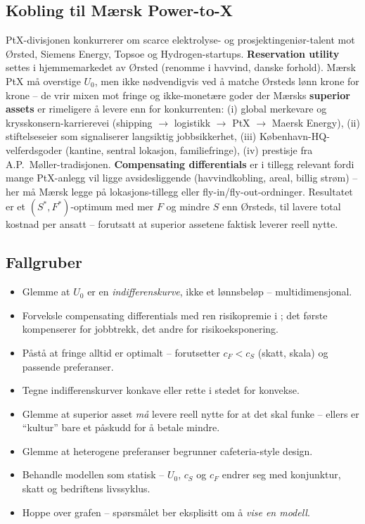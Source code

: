 \subsection*{Kobling til Mærsk Power-to-X}\quad [CASE]
PtX-divisjonen konkurrerer om scarce elektrolyse- og prosjektingeniør-talent mot Ørsted, Siemens Energy, Topsoe og Hydrogen-startups. \textbf{Reservation utility} settes i hjemmemarkedet av Ørsted (renomme i havvind, danske forhold). Mærsk PtX må overstige $U_0$, men ikke nødvendigvis ved å matche Ørsteds lønn krone for krone -- de vrir mixen mot fringe og ikke-monetære goder der Mærsks \textbf{superior assets} er rimeligere å levere enn for konkurrenten: (i) global merkevare og krysskonsern-karrierevei (shipping $\to$ logistikk $\to$ PtX $\to$ Maersk Energy), (ii) stiftelseseier som signaliserer langsiktig jobbsikkerhet, (iii) København-HQ-velferdsgoder (kantine, sentral lokasjon, familiefringe), (iv) prestisje fra A.P.\ Møller-tradisjonen. \textbf{Compensating differentials} er i tillegg relevant fordi mange PtX-anlegg vil ligge avsidesliggende (havvindkobling, areal, billig strøm) -- her må Mærsk legge på lokasjons-tillegg eller fly-in/fly-out-ordninger. Resultatet er et $(S^*, F^*)$-optimum med mer $F$ og mindre $S$ enn Ørsteds, til lavere total kostnad per ansatt -- forutsatt at superior assetene faktisk leverer reell nytte.

\subsection*{Fallgruber}
\begin{itemize}\setlength{\itemsep}{2pt}
\item Glemme at $U_0$ er en \emph{indifferenskurve}, ikke et lønnsbeløp -- multidimensjonal.
\item Forveksle compensating differentials med ren risikopremie i ; det første kompenserer for jobbtrekk, det andre for risikoeksponering.
\item Påstå at fringe alltid er optimalt -- forutsetter $c_F < c_S$ (skatt, skala) og passende preferanser.
\item Tegne indifferenskurver konkave eller rette i stedet for konvekse.
\item Glemme at superior asset \emph{må} levere reell nytte for at det skal funke -- ellers er ``kultur'' bare et påskudd for å betale mindre.
\item Glemme at heterogene preferanser begrunner cafeteria-style design.
\item Behandle modellen som statisk -- $U_0$, $c_S$ og $c_F$ endrer seg med konjunktur, skatt og bedriftens livssyklus.
\item Hoppe over grafen -- spørsmålet ber eksplisitt om å \emph{vise en modell}.
\end{itemize}

